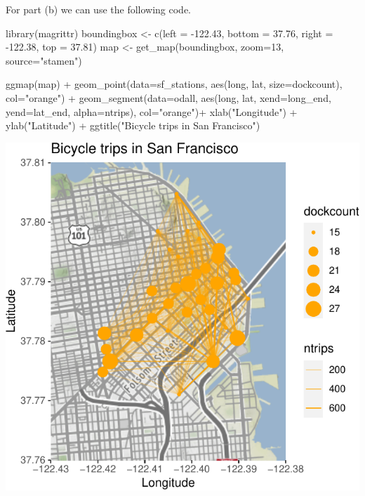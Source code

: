 \documentclass[
]{book}
\newenvironment{Shaded}{\begin{snugshade}}{\end{snugshade}}
\newcommand{\AttributeTok}[1]{\textcolor[rgb]{0.77,0.63,0.00}{#1}}
\newcommand{\DecValTok}[1]{\textcolor[rgb]{0.00,0.00,0.81}{#1}}
\newcommand{\FloatTok}[1]{\textcolor[rgb]{0.00,0.00,0.81}{#1}}
\newcommand{\FunctionTok}[1]{\textcolor[rgb]{0.00,0.00,0.00}{#1}}
\newcommand{\NormalTok}[1]{#1}
\newcommand{\OtherTok}[1]{\textcolor[rgb]{0.56,0.35,0.01}{#1}}
\newcommand{\SpecialCharTok}[1]{\textcolor[rgb]{0.00,0.00,0.00}{#1}}
\newcommand{\StringTok}[1]{\textcolor[rgb]{0.31,0.60,0.02}{#1}}
\begin{document}
For part (b) we can use the following code.

\begin{Shaded}
\begin{Highlighting}[]
\FunctionTok{library}\NormalTok{(magrittr)}
\NormalTok{boundingbox }\OtherTok{\textless{}{-}} \FunctionTok{c}\NormalTok{(}\AttributeTok{left =} \SpecialCharTok{{-}}\FloatTok{122.43}\NormalTok{, }\AttributeTok{bottom =} \FloatTok{37.76}\NormalTok{, }\AttributeTok{right =} \SpecialCharTok{{-}}\FloatTok{122.38}\NormalTok{, }\AttributeTok{top =} \FloatTok{37.81}\NormalTok{)}
\NormalTok{map }\OtherTok{\textless{}{-}} \FunctionTok{get\_map}\NormalTok{(boundingbox, }\AttributeTok{zoom=}\DecValTok{13}\NormalTok{, }\AttributeTok{source=}\StringTok{"stamen"}\NormalTok{)}



\FunctionTok{ggmap}\NormalTok{(map) }\SpecialCharTok{+} 
    \FunctionTok{geom\_point}\NormalTok{(}\AttributeTok{data=}\NormalTok{sf\_stations, }\FunctionTok{aes}\NormalTok{(long, lat, }\AttributeTok{size=}\NormalTok{dockcount), }\AttributeTok{col=}\StringTok{"orange"}\NormalTok{) }\SpecialCharTok{+}
    \FunctionTok{geom\_segment}\NormalTok{(}\AttributeTok{data=}\NormalTok{odall, }\FunctionTok{aes}\NormalTok{(long, lat, }\AttributeTok{xend=}\NormalTok{long\_end, }\AttributeTok{yend=}\NormalTok{lat\_end, }\AttributeTok{alpha=}\NormalTok{ntrips), }\AttributeTok{col=}\StringTok{"orange"}\NormalTok{)}\SpecialCharTok{+}
    \FunctionTok{xlab}\NormalTok{(}\StringTok{"Longitude"}\NormalTok{) }\SpecialCharTok{+} \FunctionTok{ylab}\NormalTok{(}\StringTok{"Latitude"}\NormalTok{) }\SpecialCharTok{+} 
    \FunctionTok{ggtitle}\NormalTok{(}\StringTok{"Bicycle trips in San Francisco"}\NormalTok{)}
\end{Highlighting}
\end{Shaded}

\includegraphics{bookdown-demo_files/figure-latex/unnamed-chunk-90-1.pdf}
\end{document}
